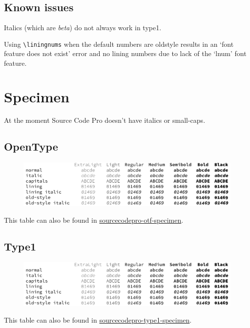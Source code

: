 \documentclass[10pt,a4paper,english]{article}
\newcommand*\file[1]{\href{run:#1.pdf}{#1}}
\begin{document}
\begin{multicols}{2}
\section{Known issues}
\begin{itemize*}
	\item Italics (which are \emph{beta}) do not always work in type1.
	\item Using \texttt{\textbackslash liningnums} when the default numbers are oldstyle results in an ‘font feature does not exist’ error and no lining numbers due to lack of the ‘lnum’ font feature.
\end{itemize*}

\newpage
\end{multicols}

\section{Specimen}
At the moment Source Code Pro doesn’t have italics or small-caps.
\label{sec:specimen}
\subsection{OpenType}
\begin{figure}[ht]
	\centering
	\includegraphics[width=\linewidth]{sourcecodepro-otf-specimen}
\end{figure}
This table can also be found in \file{sourcecodepro-otf-specimen}.

\subsection{Type1}
\begin{figure}[ht]
	\centering
	\includegraphics[width=\linewidth]{sourcecodepro-type1-specimen}
\end{figure}
This table can also be found in \file{sourcecodepro-type1-specimen}.
\end{document}
